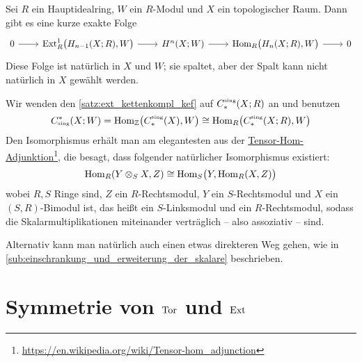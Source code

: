 \begin{satz}[label=univ_koeff_space,{name={Universelles Koeffizienten-Theorem für Kohomologie von Räumen}}]
	Sei $R$ ein Hauptidealring, $W$ ein $R$-Modul und $X$ ein topologischer Raum.
	Dann gibt es eine kurze exakte Folge
	\[
		\begin{tikzcd}[sep=2.2em]
			0 \rar & \Ext_R^1 \enbrace[\big]{H_{n-1}(X;R),W} \rar & H^n(X;W) \rar & \Hom_R \enbrace[\big]{H_n(X;R),W} \rar & 0
		\end{tikzcd}
	\]
	Diese Folge ist natürlich in $X$ und $W$; sie spaltet, aber der Spalt kann nicht natürlich in $X$ gewählt werden.
\end{satz}
\begin{beweis}
	Wir wenden den \autoref{satz:ext_kettenkompl_kef} auf $C_*^\sing(X;R)$ an und benutzen
	\[
		C_\sing^*(X;W) = \Hom_\mathbb{Z} \enbrace*{C_*^\sing(X),W} \cong \Hom_R \enbrace*{C_*^\sing(X;R),W} 
	\]
	Den Isomorphismus erhält man am elegantesten aus der \href{https://en.wikipedia.org/wiki/Tensor-hom_adjunction}{Tensor-Hom-Adjunktion}\footnote{\url{https://en.wikipedia.org/wiki/Tensor-hom_adjunction}}, die besagt, dass folgender natürlicher Isomorphismus existiert:
	\[
		\Hom_R \enbrace*{Y \otimes_S X, Z} \cong \Hom_S \enbrace[\big]{Y, \Hom_R (X,Z)}
	\]
	wobei $R,S$ Ringe sind, $Z$ ein $R$-Rechtsmodul, $Y$ ein $S$-Rechtsmodul und $X$ ein $(S,R)$-Bimodul ist, das heißt ein $S$-Linksmodul und ein $R$-Rechtsmodul, sodass die Skalarmultiplikationen miteinander verträglich -- also assoziativ -- sind.
	
	Alternativ kann man natürlich auch einen etwas direkteren Weg gehen, wie in \cref{sub:einschrankung_und_erweiterung_der_skalare} beschrieben.
\end{beweis}
\newpage

\section[Symmetrie von Tor und Ext]{Symmetrie von $\operatorname{Tor}$ und $\operatorname{Ext}$} %
\label{sec:18}

